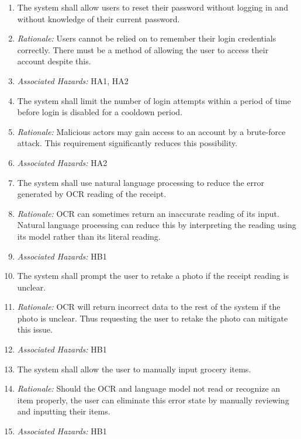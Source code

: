 \documentclass{article}
\begin{document}
\begin{enumerate}[label=SR\arabic*.]

     \item The system shall allow users to reset their password without logging in and without knowledge of their current password.
    \item[] \emph{Rationale:} Users cannot be relied on to remember their login credentials correctly. There must be a method of allowing the user to access their account despite this.
    \item[] \emph{Associated Hazards:} HA1, HA2

    \item The system shall limit the number of login attempts within a period of time before login is disabled for a cooldown period.
    \item[] \emph{Rationale:} Malicious actors may gain access to an account by a brute-force attack. This requirement significantly reduces this possibility.
    \item[] \emph{Associated Hazards:} HA2

    \item The system shall use natural language processing to reduce the error generated by OCR reading of the receipt.
    \item[] \emph{Rationale:} OCR can sometimes return an inaccurate reading of its input. Natural language processing can reduce this by interpreting the reading using its model rather than its literal reading.
    \item[] \emph{Associated Hazards:} HB1

    \item The system shall prompt the user to retake a photo if the receipt reading is unclear.
    \item[] \emph{Rationale:} OCR will return incorrect data to the rest of the system if the photo is unclear. Thus requesting the user to retake the photo can mitigate this issue.
    \item[] \emph{Associated Hazards:} HB1

    \item The system shall allow the user to manually input grocery items.
    \item[] \emph{Rationale:} Should the OCR and language model not read or recognize an item properly, the user can eliminate this error state by manually reviewing and inputting their items.
    \item[] \emph{Associated Hazards:} HB1


\end{enumerate}
\end{document}
